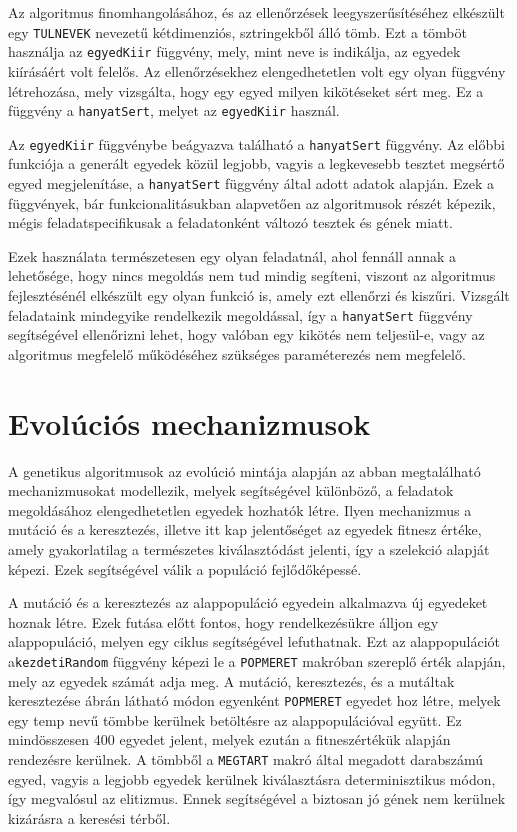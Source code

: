 \documentclass[12pt,a4paper,oneside]{report}
\begin{document}
	Az algoritmus finomhangolásához, és az ellenőrzések leegyszerűsítéséhez elkészült egy \texttt{TULNEVEK} nevezetű kétdimenziós, sztringekből álló tömb. Ezt a tömböt használja az \texttt{egyedKiir} függvény, mely, mint neve is indikálja, az egyedek kiírásáért volt felelős. Az ellenőrzésekhez elengedhetetlen volt egy olyan függvény létrehozása, mely vizsgálta, hogy egy egyed milyen kikötéseket sért meg. Ez a függvény a \texttt{hanyatSert}, melyet az \texttt{egyedKiir} használ.

	Az  \texttt{egyedKiir} függvénybe beágyazva található a \texttt{hanyatSert} függvény. Az előbbi funkciója a generált egyedek közül legjobb, vagyis a legkevesebb tesztet megsértő egyed megjelenításe, a \texttt{hanyatSert} függvény által adott adatok alapján. Ezek a függvények, bár funkcionalitásukban alapvetően az algoritmusok részét képezik, mégis feladatspecifikusak a feladatonként változó tesztek és gének miatt.

	Ezek használata természetesen egy olyan feladatnál, ahol fennáll annak a lehetősége, hogy nincs megoldás nem tud mindig segíteni, viszont az algoritmus fejlesztésénél elkészült egy olyan funkció is, amely ezt ellenőrzi és kiszűri.
Vizsgált feladataink mindegyike rendelkezik megoldással, így a \texttt{hanyatSert} függvény segítségével ellenőrizni lehet, hogy valóban egy kikötés nem teljesül-e, vagy az algoritmus megfelelő működéséhez szükséges paraméterezés nem megfelelő.


    \section{Evolúciós mechanizmusok} %
       		A genetikus algoritmusok az evolúció mintája alapján az abban megtalálható mechanizmusokat modellezik, melyek segítségével különböző, a feladatok megoldásához elengedhetetlen egyedek hozhatók létre.
Ilyen mechanizmus a mutáció és a keresztezés, illetve itt kap jelentőséget az egyedek fitnesz értéke, amely gyakorlatilag a természetes kiválasztódást jelenti, így a szelekció alapját képezi. Ezek segítségével válik a populáció fejlődőképessé. 

	A mutáció és a keresztezés az alappopuláció egyedein alkalmazva új egyedeket hoznak létre. Ezek futása előtt fontos, hogy rendelkezésükre álljon egy alappopuláció, melyen egy ciklus segítségével lefuthatnak. Ezt az alappopulációt a\texttt{kezdetiRandom} függvény képezi le a \texttt{POPMERET} makróban szereplő érték alapján, mely az egyedek számát adja meg.
	A mutáció, keresztezés, és a mutáltak keresztezése  ábrán látható módon egyenként \texttt{POPMERET} egyedet hoz létre, melyek egy temp nevű tömbbe kerülnek betöltésre az alappopulációval együtt. Ez mindösszesen 400 egyedet jelent, melyek ezután a fitneszértékük alapján rendezésre kerülnek. A tömbből a \texttt{MEGTART} makró által megadott darabszámú egyed, vagyis a legjobb egyedek kerülnek kiválasztásra determinisztikus módon, így megvalósul az elitizmus. Ennek segítségével a biztosan jó gének nem kerülnek kizárásra a keresési térből. 
	
\end{document}
